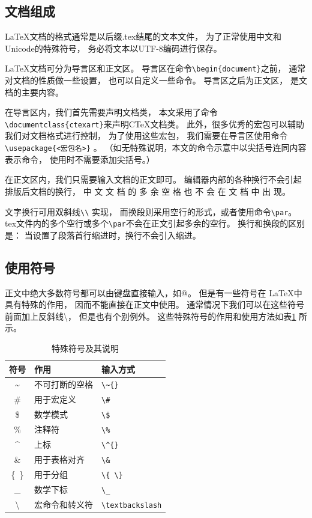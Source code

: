 \documentclass{ctexart}
\numberwithin{equation}{section}			%
\begin{document}
	\subsection{文档组成}
	\LaTeX 文档的格式通常是以后缀.tex结尾的文本文件，
	为了正常使用中文和Unicode的特殊符号，
	务必将文本以UTF-8编码进行保存。
	
	\LaTeX 文档可分为导言区和正文区。
	导言区在命令\verb|\begin{document}|之前，
	通常对文档的性质做一些设置，
	也可以自定义一些命令。
	导言区之后为正文区，
	是文档的主要内容。
	
	在导言区内，我们首先需要声明文档类，
	本文采用了命令\verb|\documentclass{ctexart}|来声明C\TeX 文档类。
	此外，很多优秀的宏包可以辅助我们对文档格式进行控制，
	为了使用这些宏包，
	我们需要在导言区使用命令\verb|\usepackage{<宏包名>}| 。
	（如无特殊说明，本文的命令示意中以尖括号连同内容表示命令，
	使用时不需要添加尖括号。）
	
	在正文区内，我们只需要输入文档的正文即可。
	编辑器内部的各种换行不会引起排版后文档的换行，
	中 文 文 档 的 多 余 空 格 也 不 会 在 文 档 中 出 现。 \par
	文字换行可用双斜线\verb|\\| 实现，
	而换段则采用空行的形式，或者使用命令\verb|\par|。
	tex文件内的多个空行或多个\verb|\par|不会在正文引起多余的空行。
	换行和换段的区别是：
	当设置了段落首行缩进时，换行不会引入缩进。
	
	\subsection{使用符号}
	正文中绝大多数符号都可以由键盘直接输入，如@。
	但是有一些符号在 \LaTeX 中具有特殊的作用，
	因而不能直接在正文中使用。
	通常情况下我们可以在这些符号前面加上反斜线\textbackslash，
	但是也有个别例外。
	这些特殊符号的作用和使用方法如表\ref{tab:symbol} 所示。
	
	\begin{table}
		\centering
		\caption{特殊符号及其说明}
		\label{tab:symbol}
		\begin{tabular}{cll}
			\toprule
			符号 & 作用 & 输入方式\\
			\midrule
			\~{} & 不可打断的空格 & \verb|\~{}| \\
			\# & 用于宏定义 & \verb|\#| \\
			\$ & 数学模式 & \verb|\$| \\
			\% & 注释符 & \verb|\%| \\
			\^{} & 上标 & \verb|\^{}| \\
			\& & 用于表格对齐 & \verb|\&| \\
			\{\ \} & 用于分组 & \verb|\{ \}| \\
			\_ & 数学下标 & \verb|\_| \\
			\textbackslash & 宏命令和转义符 & \verb|\textbackslash| \\
			\bottomrule
		\end{tabular}
	\end{table}
	
\end{document}

